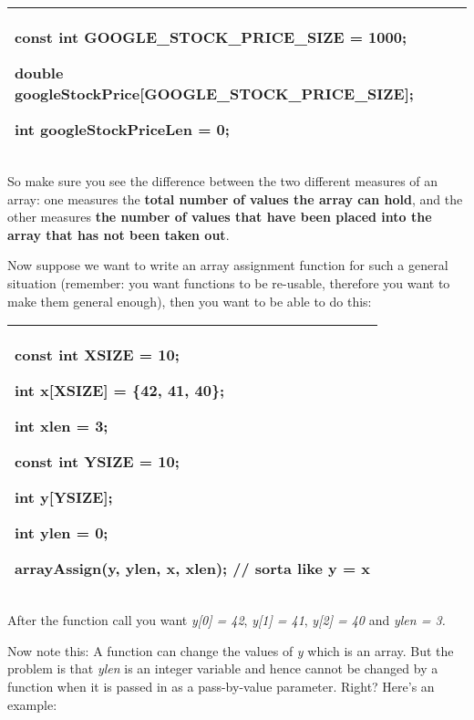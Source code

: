 \documentclass[
]{article}
\begin{document}
\begin{longtable}[]{@{}l@{}}
\toprule
\endhead
\begin{minipage}[t]{0.97\columnwidth}\raggedright
const int GOOGLE\_STOCK\_PRICE\_SIZE = 1000;

double googleStockPrice{[}GOOGLE\_STOCK\_PRICE\_SIZE{]};

int googleStockPriceLen = 0;\strut
\end{minipage}\tabularnewline
\bottomrule
\end{longtable}

So make sure you see the difference between the two different measures
of an array: one measures the \textbf{total number of values the array
can hold}, and the other measures \textbf{the number of values that have
been placed into the array that has not been taken out}.

Now suppose we want to write an array assignment function for such a
general situation (remember: you want functions to be re-usable,
therefore you want to make them general enough), then you want to be
able to do this:

\begin{longtable}[]{@{}l@{}}
\toprule
\endhead
\begin{minipage}[t]{0.97\columnwidth}\raggedright
const int XSIZE = 10;

int x{[}XSIZE{]} = \{42, 41, 40\};

int xlen = 3;

const int YSIZE = 10;

int y{[}YSIZE{]};

int ylen = 0;

arrayAssign(y, ylen, x, xlen); // sorta like y = x\strut
\end{minipage}\tabularnewline
\bottomrule
\end{longtable}

After the function call you want \emph{y{[}0{]} = 42}, \emph{y{[}1{]} =
41}, \emph{y{[}2{]} = 40} and \emph{ylen = 3. }

Now note this: A function can change the values of \emph{y} which is an
array. But the problem is that \emph{ylen} is an integer variable and
hence cannot be changed by a function when it is passed in as a
pass-by-value parameter. Right? Here's an example:
\end{document}
